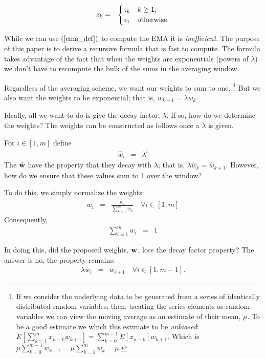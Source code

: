\documentclass{article}
\begin{document}
\begin{eqnarray}
    z_{k} &=&  \begin{cases}
     z_{k} & k \ge 1; \cr
     z_1 & \text{otherwise}. \cr
 \end{cases} \label{o:var_extend}
\end{eqnarray}

While we can use $(\ref{ema_def})$ to compute the EMA it is {\em inefficient\/}. 
The purpose of this
paper is to derive a recursive formula that is fast to compute.
The formula takes advantage of the fact that when the weights are exponentials
(powers of $\lambda$) we don't have to recompute the bulk of the sums in the 
averaging window.

Regardless of the averaging scheme, we want our weights to sum to one.%
\footnote{If we consider the underlying data to be generated from a series of identically distributed random
variables; then, treating the series elements as random variables we can view 
the moving average as an estimate of their mean, $\mu$. 
To be a good estimate we which this estimate to be {\em unbiased\/}:
$E\left[\sum_{k=1}^m x_{n-k} w_{k+1}\right] = \sum_{k=0}^{m-1} E[x_{n-k}]w_{k+1}$.
Which is $\mu \sum_{k=0}^{m-1} w_{k+1} = \mu \sum_{k=1}^{m} w_k = \mu$.}
But we also want the weights to be exponential; that is, $w_{k+1} = \lambda w_{k}$.

Ideally, all we want to do is give the decay factor, $\lambda$. If so, 
how do we determine the weights?
The weights can be constructed as follows once a $\lambda$ is given.

For $i \in [1, m]$ define
\begin{eqnarray}
    {\hat w}_i &=& \lambda^i 
\end{eqnarray}
The ${\hat {\bf w}}$ have the property that they decay with $\lambda$;
that is, $\lambda {\hat w}_{k} = {\hat w}_{k+1}$. However, how do we ensure that
these values sum to 1 over the window? 

To do this, we simply normalize the weights:
\begin{eqnarray}
    w_i &=&  \frac{{\hat w}_i}{\sum_{k=1}^m {\hat w}_k} \quad \forall i \in [1, m] 
\end{eqnarray}
Consequently,
\begin{eqnarray}
    \sum_{i=1}^m w_i &=& 1 \label{o:weights_normalized}
\end{eqnarray}

In doing this, did the proposed weights, ${\bf w}$, lose the decay factor
property? The answer is no, the property remains: 
\begin{eqnarray}
    \lambda w_{i} &=& w_{i+1} \quad \forall i \in [1, m-1].  \label{o:weights_power}
\end{eqnarray}
\end{document}
